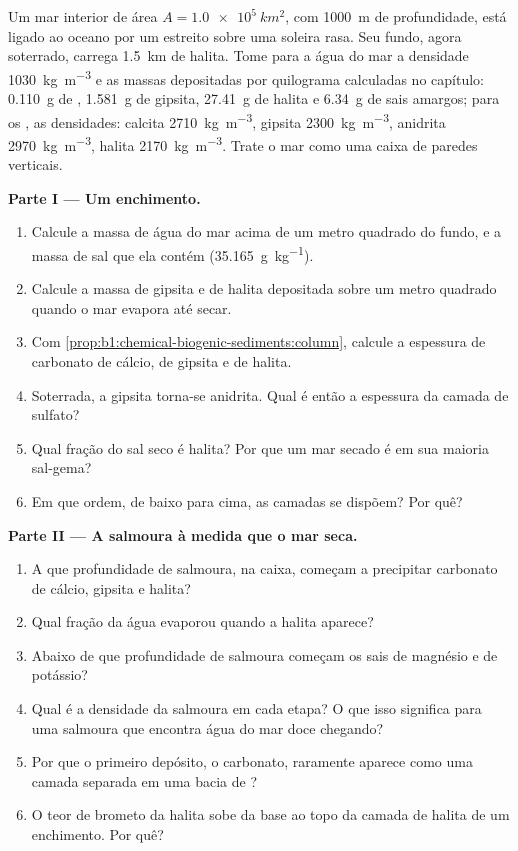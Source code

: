 \begin{problem}
\label{pb:b1:chemical-biogenic-sediments:1}
Um mar interior de área $A = \qty{1.0e5}{km^2}$, com \qty{1000}{m} de profundidade, está
ligado ao oceano por um estreito sobre uma soleira rasa. Seu fundo, agora soterrado, carrega
\qty{1.5}{km} de halita. Tome para a água do mar a densidade \qty{1030}{kg.m^{-3}} e as
massas depositadas por quilograma calculadas no capítulo: \qty{0.110}{g} de ,
\qty{1.581}{g} de gipsita, \qty{27.41}{g} de halita e \qty{6.34}{g} de sais amargos; para os
, as densidades: calcita \qty{2710}{kg.m^{-3}}, gipsita \qty{2300}{kg.m^{-3}}, anidrita
\qty{2970}{kg.m^{-3}}, halita \qty{2170}{kg.m^{-3}}. Trate o mar como uma caixa de paredes verticais.

\medskip
\noindent\textbf{Parte I --- Um enchimento.}
\begin{enumerate}
  \item Calcule a massa de água do mar acima de um metro quadrado do fundo, e a massa de sal
        que ela contém (\qty{35.165}{g.kg^{-1}}).
  \item Calcule a massa de gipsita e de halita depositada sobre um metro quadrado quando o
        mar evapora até secar.
  \item Com \cref{prop:b1:chemical-biogenic-sediments:column}, calcule a espessura de carbonato
        de cálcio, de gipsita e de halita.
  \item Soterrada, a gipsita torna-se anidrita. Qual é então a espessura da camada de sulfato?
  \item Qual fração do sal seco é halita? Por que um mar secado é em sua maioria sal-gema?
  \item Em que ordem, de baixo para cima, as camadas se dispõem? Por quê?
\end{enumerate}

\noindent\textbf{Parte II --- A salmoura à medida que o mar seca.}
\begin{enumerate}[resume]
  \item A que profundidade de salmoura, na caixa, começam a precipitar carbonato de cálcio,
        gipsita e halita?
  \item Qual fração da água evaporou quando a halita aparece?
  \item Abaixo de que profundidade de salmoura começam os sais de magnésio e de potássio?
  \item Qual é a densidade da salmoura em cada etapa? O que isso significa para uma salmoura
        que encontra água do mar doce chegando?
  \item Por que o primeiro depósito, o carbonato, raramente aparece como uma camada separada
        em uma bacia de ?
  \item O teor de brometo da halita sobe da base ao topo da camada de halita de um enchimento.
        Por quê?
\end{enumerate}


\end{problem}
